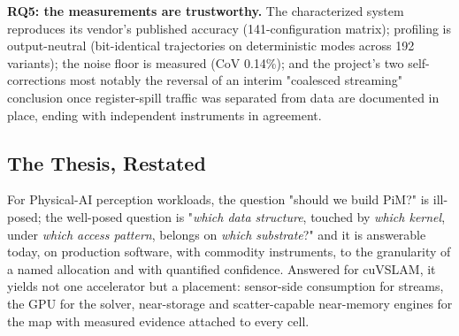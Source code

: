 \textbf{RQ5: the measurements are trustworthy.} The characterized system reproduces its vendor's published accuracy (141-configuration matrix); profiling is output-neutral (bit-identical trajectories on deterministic modes across 192 variants); the noise floor is measured (CoV 0.14\%); and the project's two self-corrections most notably the reversal of an interim "coalesced streaming" conclusion once register-spill traffic was separated from data are documented in place, ending with independent instruments in agreement.

\subsection{The Thesis, Restated}

For Physical-AI perception workloads, the question "should we build PiM?" is ill-posed; the well-posed question is "\emph{which data structure}, touched by \emph{which kernel}, under \emph{which access pattern}, belongs on \emph{which substrate}?" and it is answerable today, on production software, with commodity instruments, to the granularity of a named allocation and with quantified confidence. Answered for cuVSLAM, it yields not one accelerator but a placement: sensor-side consumption for streams, the GPU for the solver, near-storage and scatter-capable near-memory engines for the map with measured evidence attached to every cell.
